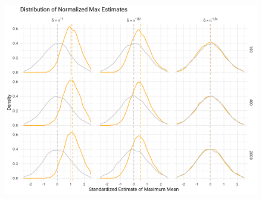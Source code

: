 \documentclass[aspectratio=169, professionalfonts]{beamer}
\begin{document}
\begin{frame}
	\begin{figure}
		\includegraphics[width=.9\textwidth]{figures/max_means_sim_plot}
	\end{figure}
\end{frame}
\end{document}
